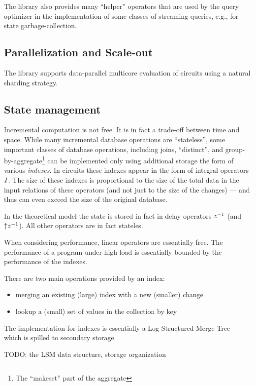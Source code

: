 The library also provides many ``helper'' operators that are used by
the query optimizer in the implementation of some classes of streaming
queries, e.g., for state garbage-collection.

\subsection{Parallelization and Scale-out}

The library supports data-parallel multicore evaluation of circuits
using a natural sharding strategy.

\subsection{State management}

Incremental computation is not free.  It is in fact a trade-off
between time and space.  While many incremental database operations
are ``stateless'', some important classes of database operations,
including joins, ``distinct'', and group-by-aggregate\footnote{The
``makeset'' part of the aggregate} can be implemented only using
additional storage the form of various \emph{indexes}.  In \dbsp
circuits these indexes appear in the form of integral operators $\mathit{I}$.
The size of these indexes is proportional to the size of the total
data in the input relations of these operators (and not just to the
size of the changes) --- and thus can even exceed the size of the
original database.

In the \dbsp theoretical model the state is stored in fact in delay
operators $z^{-1}$ (and ${\uparrow}z^{-1}$).  All other operators are in fact
stateles.

When considering performance, linear operators are essentially free.
The performance of a \dbsp program under high load is essentially
bounded by the performance of the indexes.

There are two main operations provided by an index:
\begin{itemize}
\item merging an existing (large) index with a new (smaller) change
\item lookup a (small) set of values in the collection by key
\end{itemize}

The implementation for indexes is essentially a Log-Structured Merge
Tree~\cite{oneil-ai96} which is spilled to secondary storage.

TODO: the LSM data structure, storage organization

